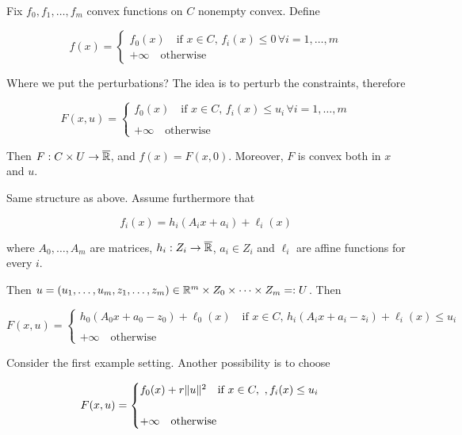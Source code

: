 \begin{example}
    
    Fix $f_0,f_1,\dots,f_m$ convex functions on $C$ nonempty convex. Define

    \[ f(x) = 
        \begin{cases}
            f_0(x) \quad \text{if } x \in C,\, f_i(x) \le 0 \, \forall i = 1,\dots,m \\
            +\infty \quad \text{otherwise}
        \end{cases}
    \]

    Where we put the perturbations? The idea is to perturb the constraints, therefore

    \[ F(x,u) = 
        \begin{cases}
            f_0(x) \quad \text{if } x \in C,\, f_i(x) \le u_i \, \forall i = 1,\dots,m \\
            \\
            +\infty \quad \text{otherwise}
        \end{cases}
    \]

    Then $F : C \times U \to \overline{\mathbb{R}}$, and $f(x) = F(x,0)$. Moreover, $F$ is convex both in $x$ and $u$.

\end{example}

\begin{example}
    
    Same structure as above. Assume furthermore that 

    \[ f_i(x) = h_i(A_i x + a_i) + \ell_i(x) \]

    where $A_0,\dots,A_m$ are matrices, $h_i : Z_i \to \overline{\mathbb{R}}$, $a_i \in Z_i$ and $\ell_i$ are affine functions for every $i$.

    Then $u = (u_1,\dots,u_m, z_1,\dots,z_m) \in \mathbb{R}^m \times Z_0 \times \dots \times Z_m =: U$. Then 

    \[ F(x,u) = 
        \begin{cases}
            h_0(A_0x + a_0 - z_0) + \ell_0(x) \quad \text{if } x \in C,\, h_i(A_i x + a_i - z_i) + \ell_i(x) \le u_i \\
            \\
            +\infty \quad\text{otherwise}
        \end{cases}
    \]

\end{example}

\begin{example}
    
    Consider the first example setting. Another possibility is to choose

    \[ F(x,u) = 
        \begin{cases}
            f_0(x) + r\lVert u \rVert^2 \quad\text{if } x \in C,\ ,f_i(x) \le u_i \\
            \\
            +\infty \quad\text{otherwise}
        \end{cases}
    \]

\end{example}

